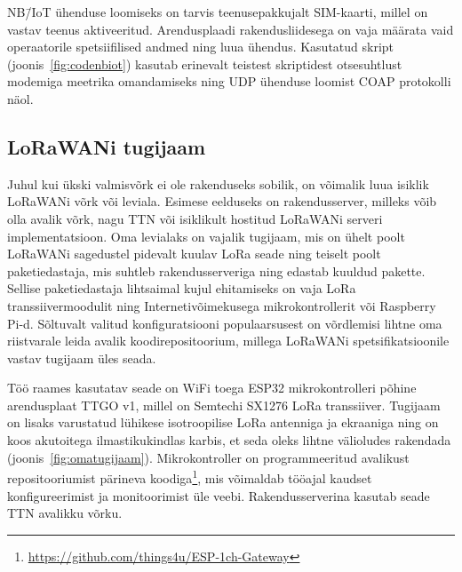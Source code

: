 \documentclass[12pt]{article}
\begin{document}
    NB\=/IoT ühenduse loomiseks on tarvis teenusepakkujalt SIM-kaarti, millel on vastav teenus aktiveeritud.
    Arendusplaadi rakendusliidesega on vaja määrata vaid operaatorile spetsiifilised andmed ning luua ühendus.
    Kasutatud skript (joonis~\ref{fig:codenbiot}) kasutab erinevalt teistest skriptidest otsesuhtlust modemiga meetrika omandamiseks ning UDP ühenduse loomist COAP protokolli näol.
    \newpage
    \subsection{LoRaWANi tugijaam}

    Juhul kui ükski valmisvõrk ei ole rakenduseks sobilik, on võimalik luua isiklik {LoRaWANi} võrk või leviala.
    Esimese eelduseks on rakendusserver, milleks võib olla avalik võrk, nagu TTN või isiklikult hostitud LoRaWANi serveri implementatsioon.
    Oma levialaks on vajalik tugijaam, mis on ühelt poolt LoRaWANi sagedustel pidevalt kuulav LoRa seade ning teiselt poolt paketiedastaja, mis suhtleb rakendusserveriga ning edastab kuuldud pakette.
    Sellise paketiedastaja lihtsaimal kujul ehitamiseks on vaja LoRa transsiivermoodulit ning Internetivõimekusega mikrokontrollerit või Raspberry Pi-d.
    Sõltuvalt valitud konfiguratsiooni populaarsusest on võrdlemisi lihtne oma riistvarale leida avalik koodirepositoorium, millega LoRaWANi spetsifikatsioonile vastav tugijaam üles seada.

    Töö raames kasutatav seade on WiFi toega ESP32 mikrokontrolleri põhine arendusplaat TTGO v1, millel on Semtechi SX1276 LoRa transsiiver.
    Tugijaam on lisaks varustatud lühikese isotroopilise LoRa antenniga ja ekraaniga ning on koos akutoitega ilmastikukindlas karbis, et seda oleks lihtne välioludes rakendada (joonis~\ref{fig:omatugijaam}).
    Mikrokontroller on programmeeritud avalikust repositooriumist pärineva koodiga\footnote{\url{https://github.com/things4u/ESP-1ch-Gateway}}, mis võimaldab tööajal kaudset konfigureerimist ja monitoorimist üle veebi.
    Rakendusserverina kasutab seade TTN avalikku võrku.
\end{document}
